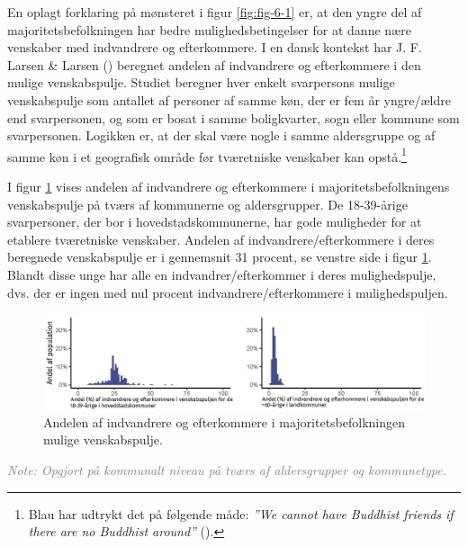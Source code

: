 \documentclass[
]{book}
\begin{document}
En oplagt forklaring på mønsteret i figur \ref{fig:fig-6-1} er, at den yngre del af majoritetsbefolkningen har bedre mulighedsbetingelser for at danne nære venskaber med indvandrere og efterkommere. I en dansk kontekst har J. F. Larsen \& Larsen () beregnet andelen af indvandrere og efterkommere i den mulige venskabspulje. Studiet beregner hver enkelt svarpersons mulige venskabspulje som antallet af personer af samme køn, der er fem år yngre/ældre end svarpersonen, og som er bosat i samme boligkvarter, sogn eller kommune som svarpersonen. Logikken er, at der skal være nogle i samme aldersgruppe og af samme køn i et geografisk område før tværetniske venskaber kan opstå.\footnote{Blau har udtrykt det på følgende måde: \emph{''We cannot have Buddhist friends if there are no Buddhist around''} ().}

I figur \ref{fig:fig-6-2} vises andelen af indvandrere og efterkommere i majoritetsbefolkningens venskabspulje på tværs af kommunerne og aldersgrupper. De 18-39-årige svarpersoner, der bor i hovedstadskommunerne, har gode muligheder for at etablere tværetniske venskaber. Andelen af indvandrere/efterkommere i deres beregnede venskabspulje er i gennemsnit 31 procent, se venstre side i figur \ref{fig:fig-6-2}. Blandt disse unge har alle en indvandrer/efterkommer i deres mulighedspulje, dvs. der er ingen med nul procent indvandrere/efterkommere i mulighedspuljen.

\newpage

\begin{figure}
\includegraphics[width=1\linewidth]{images/Figur_6_2} \caption{Andelen af indvandrere og efterkommere i majoritetsbefolkningen mulige venskabspulje.}\label{fig:fig-6-2}
\end{figure}

\begin{footnotesize}\textit{\textcolor{gray}{
Note: Opgjort på kommunalt niveau på tværs af aldersgrupper og kommunetype.
}}
\end{footnotesize}
\end{document}
